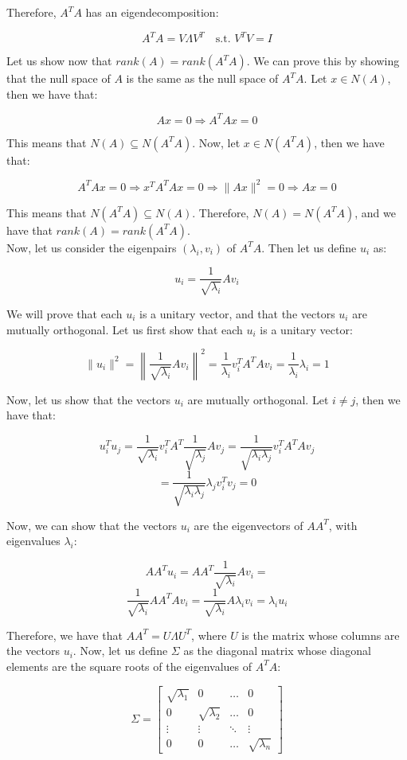 Therefore, $A^T A$ has an eigendecomposition:

$$A^T A = V \Lambda V^T \quad \text{s.t. } V^T V = I$$

Let us show now that $rank(A) = rank(A^T A)$. We can prove this by showing that the null space of $A$ 
is the same as the null space of $A^T A$. Let $x \in N(A)$, then we have that:

$$A x = 0 \Rightarrow A^T A x = 0$$

This means that $N(A) \subseteq N(A^T A)$. Now, let $x \in N(A^T A)$, then we have that:

$$A^T A x = 0 \Rightarrow x^T A^T A x = 0 \Rightarrow \|A x\|^2 = 0 \Rightarrow A x = 0$$

This means that $N(A^T A) \subseteq N(A)$. Therefore, $N(A) = N(A^T A)$, and we have 
that $rank(A) = rank(A^T A)$.\\

Now, let us consider the eigenpairs $(\lambda_i, v_i)$ of $A^T A$. Then let us define $u_i$ as:

$$u_i = \frac{1}{\sqrt{\lambda_i}} A v_i$$

We will prove that each $u_i$ is a unitary vector, and that the vectors $u_i$ are mutually orthogonal. 
Let us first show that each $u_i$ is a unitary vector:

$$\|u_i\|^2 = \left\| \frac{1}{\sqrt{\lambda_i}} A v_i \right\|^2 = \frac{1}{\lambda_i} v_i^T A^T A v_i = \frac{1}{\lambda_i} \lambda_i = 1$$

Now, let us show that the vectors $u_i$ are mutually orthogonal. Let $i \neq j$, then we have that:

$$u_i^T u_j = \frac{1}{\sqrt{\lambda_i}} v_i^T A^T \frac{1}{\sqrt{\lambda_j}} A v_j = \frac{1}{\sqrt{\lambda_i \lambda_j}} v_i^T A^T A v_j$$
$$= \frac{1}{\sqrt{\lambda_i \lambda_j}} \lambda_j v_i^T v_j = 0$$

Now, we can show that the vectors $u_i$ are the eigenvectors of $A A^T$, with eigenvalues
$\lambda_i$:

$$A A^T u_i = A A^T \frac{1}{\sqrt{\lambda_i}} A v_i = $$
$$\frac{1}{\sqrt{\lambda_i}} A A^T A v_i = \frac{1}{\sqrt{\lambda_i}} A \lambda_i v_i = \lambda_i u_i$$

Therefore, we have that $A A^T = U \Lambda U^T$, where $U$ is the matrix whose columns are the vectors $u_i$.
Now, let us define $\Sigma$ as the diagonal matrix whose diagonal elements are the square roots of the eigenvalues of $A^T A$:

$$\Sigma = \begin{bmatrix}
    \sqrt{\lambda_1} & 0 & \ldots & 0 \\
    0 & \sqrt{\lambda_2} & \ldots & 0 \\
    \vdots & \vdots & \ddots & \vdots \\
    0 & 0 & \ldots & \sqrt{\lambda_n}
\end{bmatrix}$$

